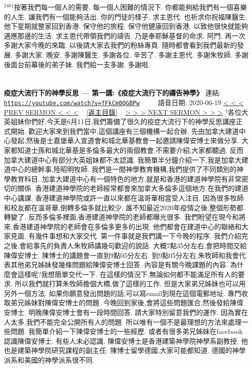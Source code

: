 \documentclass{book}
\begin{document}
$^{2481}$按著我們每一個人的需要.
每一個人困難的情況下.
你都能夠給我們有一個喜樂的人生.
讓我們有一個能夠活出.
你的門徒的樣子.
求主恩代.
也祈求你祝福陳醫生.
他下星期就整家回到香港.
保守他的旅程.
保守他健康回到香港.
以致他很快就能夠適應那邊的生活.
求主恩代帶領我們的禱告.
乃是奉耶穌基督的命求.
阿門.
再一次多謝大家今晚的來臨.
以後請大家去我們的粉絲專頁.
隨時都會看到我們最新的發展.
多謝大家.
晚安.
多謝陳醫生.
多謝各位.
辛苦了.
多謝主恩代.
多謝朱牧師.
多謝後面台前幕後的弟子妹.
我們給一支多謝.
多謝啦.
\newpage



\section{}
\label{sec:fFkCm0QGBPw}
\textbf{疫症大流行下的神學反思 --- 第一講:《疫症大流行下的禱告神學》}
\newline
\newline
連結: \href{https://youtube.com/watch?v=fFkCm0QGBPw}{\texttt{https://youtube.com/watch?v=fFkCm0QGBPw}} ~~~~ 語音日期: 2020-06-19
\newline
\newline
\hyperref[sec:yb30yQHiYdM]{\small{< < < PREV SERMON < < <}}
~
\hyperref[sec:index]{\small{[返主目錄]}}
~
\hyperref[sec:P0Y2lvzICsM]{\small{> > > NEXT SERMON > > >}}
\newline
\newline
$^{1}$各位大英姐妹你們好,今天是6月11日,我們籌備了很久的疫症大流行下的神學反思講座正式開始.
歡迎大家來到我們當中,這個講座有三個機構一起合辦.
先由加拿大建道中心發起,然後是士嘉堡華人宣道會和城北華基教會一起邀請陳偉安博士來做分享.
大家都知道士孫和城北華基是多倫多最大的兩個教會,不需要介紹,大家都聽過.
反而加拿大建道中心有部分大英姐妹都不太認識.
我簡單半分鐘介紹一下,我是加拿大建道中心的總幹事,陸昭明牧師.
我們是一間神學教育機構,我們提供了不同類別的神學教育科目.
加拿大建道中心有一個特色的地方,就是和香港的建道神學院有非常密切的關係.
香港建道神學院的老師經常都會來加拿大多倫多這個地方,在我們的建道中心講課.
香港建道神學院或許一直以來都在溫哥華相當受人注目.
因為很多牧師和校友都在溫哥華,倒轉多倫多就比較少.
誰不知最近2020年疫情之後,整個形勢都轉變了.
反而多倫多裡面,香港建道神學院的老師都曝光很多.
我們盼望在現今和將來,香港建道神學院的老師會在多倫多更多的出現.
他們都會在建道中心的聯絡和大家見面.
有幾件事想和大家交代.
第一件事就是我們講一下今晚的程序.
我們介紹完之後,會給事先的負責人朱牧師講幾句歡迎的說話.
大概7點35分左右,會把時間交給陳偉安博士.
陳博士的講題會一直到9點05分左右.
到9點05分左右,朱牧師和我會代表其他弟兄姊妹發幾條問題給陳偉安博士回答.
內容是有關今晚課題的內容.
為什麼會這樣呢?我想簡單交代一下.
在這樣的情況下,無論如何都不能滿足所有人的要求.
所以我們就打算朱牧師擔個大橋,做了這樣的工作.
但是大家弟兄姊妹也可以用另外一個方法.
如果你願意發出問題的話,可以寫email到現在這個電郵地址.
專門收取弟兄姊妹對陳偉安博士的問題.
今晚回到家後,會將這些問題匯合,然後發給陳偉安博士.
明晚陳偉安博士會有一段時間回答.
請大家特別留意我們的運作.
因為實在人太多,我們不能完全公開所有人的問題.
所以唯有一個不是最理想的方法來處理一些問題.
我簡單介紹一下陳偉安博士的一些經歷.
或者有很多弟兄姊妹在facebook認識陳偉安博士.
有些人未必認識.
陳偉安博士是香港建築神學院神學系副教授.
他也是建築神學院研究課程的副主任.
陳博士留學德國,大家可能都知道.
德國的神學派系和美國的神學派系很不同.
\end{document}
